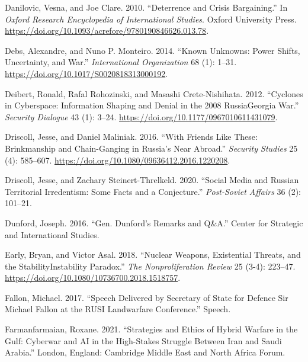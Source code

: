 \documentclass[
]{article}
\begin{document}
\leavevmode\hypertarget{ref-danilovic_deterrencecrisisbargaining_2010}{}%
Danilovic, Vesna, and Joe Clare. 2010. ``Deterrence and Crisis Bargaining.'' In \emph{Oxford Research Encyclopedia of International Studies}. Oxford University Press. \url{https://doi.org/10.1093/acrefore/9780190846626.013.78}.

\leavevmode\hypertarget{ref-debs_knownunknownspower_2014}{}%
Debs, Alexandre, and Nuno P. Monteiro. 2014. ``Known Unknowns: Power Shifts, Uncertainty, and War.'' \emph{International Organization} 68 (1): 1--31. \url{https://doi.org/10.1017/S0020818313000192}.

\leavevmode\hypertarget{ref-deibert_cyclonescyberspaceinformation_2012}{}%
Deibert, Ronald, Rafal Rohozinski, and Masashi Crete-Nishihata. 2012. ``Cyclones in Cyberspace: Information Shaping and Denial in the 2008 RussiaGeorgia War.'' \emph{Security Dialogue} 43 (1): 3--24. \url{https://doi.org/10.1177/0967010611431079}.

\leavevmode\hypertarget{ref-driscoll_friendsthesebrinkmanship_2016}{}%
Driscoll, Jesse, and Daniel Maliniak. 2016. ``With Friends Like These: Brinkmanship and Chain-Ganging in Russia's Near Abroad.'' \emph{Security Studies} 25 (4): 585--607. \url{https://doi.org/10.1080/09636412.2016.1220208}.

\leavevmode\hypertarget{ref-driscoll_socialmediarussian_2020}{}%
Driscoll, Jesse, and Zachary Steinert-Threlkeld. 2020. ``Social Media and Russian Territorial Irredentism: Some Facts and a Conjecture.'' \emph{Post-Soviet Affairs} 36 (2): 101--21.

\leavevmode\hypertarget{ref-dunford_gendunfordremarks_2016}{}%
Dunford, Joseph. 2016. ``Gen. Dunford's Remarks and Q\&A.'' Center for Strategic and International Studies.

\leavevmode\hypertarget{ref-early_nuclearweaponsexistential_2018}{}%
Early, Bryan, and Victor Asal. 2018. ``Nuclear Weapons, Existential Threats, and the StabilityInstability Paradox.'' \emph{The Nonproliferation Review} 25 (3-4): 223--47. \url{https://doi.org/10.1080/10736700.2018.1518757}.

\leavevmode\hypertarget{ref-fallon_speechdeliveredsecretary_2017}{}%
Fallon, Michael. 2017. ``Speech Delivered by Secretary of State for Defence Sir Michael Fallon at the RUSI Landwarfare Conference.'' Speech.

\leavevmode\hypertarget{ref-farmanfarmaian_strategiesethicshybrid_2021}{}%
Farmanfarmaian, Roxane. 2021. ``Strategies and Ethics of Hybrid Warfare in the Gulf: Cyberwar and AI in the High-Stakes Struggle Between Iran and Saudi Arabia.'' London, England: Cambridge Middle East and North Africa Forum.
\end{document}
